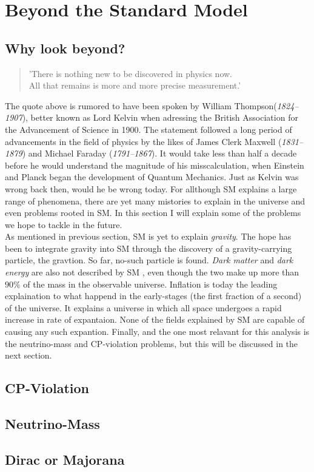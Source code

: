 \section{Beyond the Standard Model}
\subsection{Why look beyond?}
\begin{center}
    \hyphenblockcquote{UKenglish}{Kelvin}{
        'There is nothing new to be discovered in physics now.\\
        All that remains is more and more precise measurement.'
        }
\end{center}
The quote above is rumored to have been spoken by William Thompson(\emph{1824–1907}), better
known as Lord Kelvin when adressing the British Association for the Advancement
of Science in 1900. The statement followed a long period of advancements in the
field of physics by the likes of James Clerk Maxwell (\emph{1831–1879}) and 
Michael Faraday (\emph{1791–1867}). It would take less than half a decade
before he would understand the magnitude of his misscalculation, when Einstein and 
Planck began the development of Quantum Mechanics. Just as Kelvin was wrong back then, 
would he be wrong today. For allthough \ac{SM} explains a large range of phenomena,
there are yet many mistories to explain in the universe and even problems rooted in \ac{SM}.
In this section I will explain some of the problems we hope to tackle in the future. 
\\ \newline
As mentioned in previous section, \ac{SM} is yet to explain \emph{gravity}. The hope has been
to integrate gravity into \ac{SM} through the discovery of a gravity-carrying particle, 
the gravtion. So far, no-such particle is found. \emph{Dark matter} and \emph{dark energy} are 
also not described by \ac{SM} , even though the two make up more than $90\%$ of the mass in the 
observable universe. Inflation is today the leading explaination to what happend in the early-stages
(the first fraction of a second) of the universe. It explains a universe in which all space
undergoes a rapid increase in rate of expantaion. None of the fields explained by \ac{SM} are 
capable of causing any such expantion. Finally, and the one most relavant for this analysis is the
neutrino-mass and \ac{CP}-violation problems, but this will be discussed in the next section.
\subsection{CP-Violation}

\subsection{Neutrino-Mass}

\subsection{Dirac or Majorana}
 